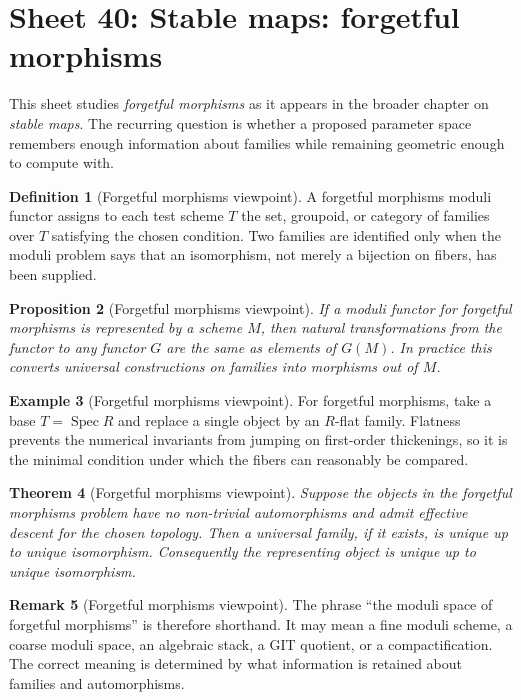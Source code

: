 \documentclass[11pt]{amsart}
\newtheorem{theorem}{Theorem}[section]
\newtheorem{proposition}[theorem]{Proposition}
\theoremstyle{definition}
\newtheorem{definition}[theorem]{Definition}
\newtheorem{example}[theorem]{Example}
\newtheorem{remark}[theorem]{Remark}
\newcommand{\Spec}{\operatorname{Spec}}
\begin{document}
\section{Sheet 40: Stable maps: forgetful morphisms}
This sheet studies \emph{forgetful morphisms} as it appears in the broader chapter on \emph{stable maps}.  The recurring question is whether a proposed parameter space remembers enough information about families while remaining geometric enough to compute with.
\begin{definition}[Forgetful morphisms viewpoint]
A forgetful morphisms moduli functor assigns to each test scheme $T$ the set, groupoid, or category of families over $T$ satisfying the chosen condition.  Two families are identified only when the moduli problem says that an isomorphism, not merely a bijection on fibers, has been supplied.
\end{definition}
\begin{proposition}[Forgetful morphisms viewpoint]
If a moduli functor for forgetful morphisms is represented by a scheme $M$, then natural transformations from the functor to any functor $G$ are the same as elements of $G(M)$.  In practice this converts universal constructions on families into morphisms out of $M$.
\end{proposition}
\begin{example}[Forgetful morphisms viewpoint]
For forgetful morphisms, take a base $T=\Spec R$ and replace a single object by an $R$-flat family.  Flatness prevents the numerical invariants from jumping on first-order thickenings, so it is the minimal condition under which the fibers can reasonably be compared.
\end{example}
\begin{theorem}[Forgetful morphisms viewpoint]
Suppose the objects in the forgetful morphisms problem have no non-trivial automorphisms and admit effective descent for the chosen topology.  Then a universal family, if it exists, is unique up to unique isomorphism.  Consequently the representing object is unique up to unique isomorphism.
\end{theorem}
\begin{remark}[Forgetful morphisms viewpoint]
The phrase ``the moduli space of forgetful morphisms'' is therefore shorthand.  It may mean a fine moduli scheme, a coarse moduli space, an algebraic stack, a GIT quotient, or a compactification.  The correct meaning is determined by what information is retained about families and automorphisms.
\end{remark}
\end{document}

